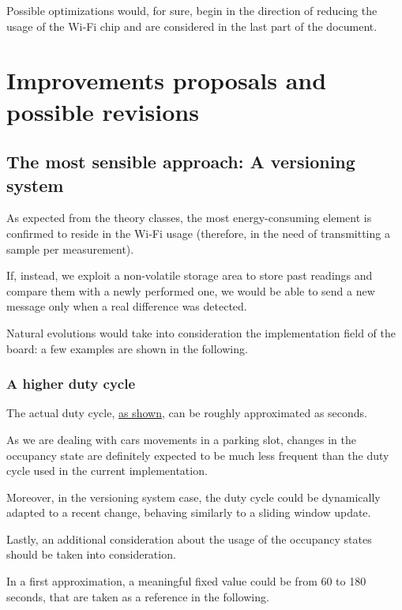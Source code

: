 \documentclass[a4paper,11pt]{article} %
\begin{document}
    Possible optimizations would, for sure, begin in the direction of reducing the usage of the Wi-Fi chip and are considered in the last part of the document.


    \section{Improvements proposals and possible revisions}\label{sec:improvements-proposals-and-possible-revisions}

    \subsection{The most sensible approach: A versioning system}\label{subsec:the-most-sensible-approach:-a-versioning-system}
    As expected from the theory classes, the most energy-consuming element is confirmed to reside in the Wi-Fi usage (therefore, in the need of transmitting a sample per measurement).

    If, instead, we exploit a non-volatile storage area to store past readings and compare them with a newly performed one, we would be able to send a new message only when a real difference was detected.

    Natural evolutions would take into consideration the implementation field of the board: a few examples are shown in the following.

    \subsubsection{A higher duty cycle}\label{subsubsec:higher-duty-cycle}

    The actual duty cycle, \hyperref[subsec:time-estimation]{as shown}, can be roughly approximated as  seconds.

    As we are dealing with cars movements in a parking slot, changes in the occupancy state are definitely expected to be much less frequent than the duty cycle used in the current implementation.

    Moreover, in the versioning system case, the duty cycle could be dynamically adapted to a recent change, behaving similarly to a sliding window update.

    Lastly, an additional consideration about the usage of the occupancy states should be taken into consideration.

    In a first approximation, a meaningful fixed value could be from 60 to 180 seconds, that are taken as a reference in the following.
\end{document}
